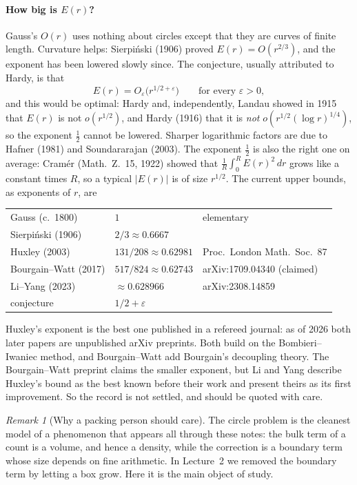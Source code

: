\documentclass[11pt,openany]{book}
\theoremstyle{plain}
\theoremstyle{definition}
\theoremstyle{remark}
\newtheorem{remark}[theorem]{Remark}
\newcommand{\abs}[1]{\left\lvert #1 \right\rvert}
\begin{document}
\paragraph{How big is $E(r)$?} Gauss's $O(r)$ uses nothing about circles except that they are curves
of finite length. Curvature helps: Sierpi\'nski (1906) proved $E(r)=O(r^{2/3})$, and the exponent has
been lowered slowly since. The conjecture, usually attributed to Hardy, is that
\[
  E(r)=O_\varepsilon\big(r^{1/2+\varepsilon}\big)\qquad\text{for every }\varepsilon>0,
\]
and this would be optimal: Hardy and, independently, Landau showed in 1915 that $E(r)$ is not
$o(r^{1/2})$, and Hardy (1916) that it is \emph{not} $o(r^{1/2}(\log r)^{1/4})$, so the
exponent $\frac12$ cannot be lowered. Sharper logarithmic factors are due to Hafner (1981) and
Soundararajan (2003). The exponent $\frac12$ is also the right one on average: Cram\'er (Math.\ Z.\ 15,
1922) showed
that $\frac{1}{R}\int_0^RE(r)^2\,dr$ grows like a constant times $R$, so a typical $\abs{E(r)}$ is of
size $r^{1/2}$. The current upper bounds, as exponents of $r$, are
\begin{center}
\renewcommand{\arraystretch}{1.15}
\begin{tabular}{lll}
\toprule
Gauss (c.~1800) & $1$ & elementary\\
Sierpi\'nski (1906) & $2/3\approx0.6667$ & \\
Huxley (2003) & $131/208\approx0.62981$ & Proc.\ London Math.\ Soc.\ 87\\
Bourgain--Watt (2017) & $517/824\approx0.62743$ & arXiv:1709.04340 (claimed)\\
Li--Yang (2023) & $\approx0.628966$ & arXiv:2308.14859\\
conjecture & $1/2+\varepsilon$ & \\
\bottomrule
\end{tabular}
\end{center}
Huxley's exponent is the best one published in a refereed journal: as of 2026 both later papers are
unpublished arXiv preprints. Both build on the Bombieri--Iwaniec method, and Bourgain--Watt add
Bourgain's decoupling theory. The Bourgain--Watt preprint claims the smaller exponent, but Li and Yang
describe Huxley's bound as the best known before their work and present theirs as its first improvement.
So the record is not settled, and should be quoted with care.

\begin{remark}[Why a packing person should care]
The circle problem is the cleanest model of a phenomenon that appears all through these notes: the bulk
term of a count is a volume, and hence a density, while the correction is a boundary term whose size
depends on fine arithmetic. In Lecture~2 we removed the boundary term by letting a box grow. Here it is
the main object of study.
\end{remark}
\end{document}
